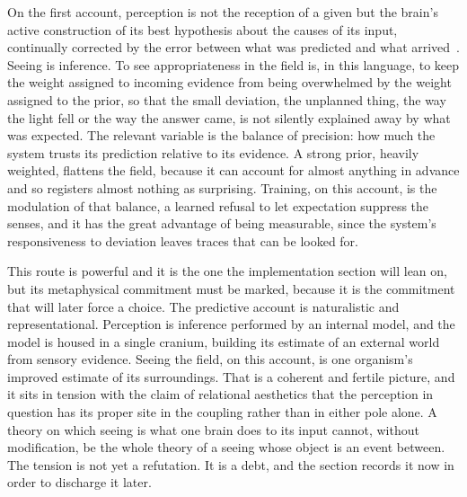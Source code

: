 On the first account, perception is not the reception of a given but the brain's active construction of its best hypothesis about the causes of its input, continually corrected by the error between what was predicted and what arrived~\parencite{clark_whatever,friston_free}. Seeing is inference. To see appropriateness in the field is, in this language, to keep the weight assigned to incoming evidence from being overwhelmed by the weight assigned to the prior, so that the small deviation, the unplanned thing, the way the light fell or the way the answer came, is not silently explained away by what was expected. The relevant variable is the balance of precision: how much the system trusts its prediction relative to its evidence. A strong prior, heavily weighted, flattens the field, because it can account for almost anything in advance and so registers almost nothing as surprising. Training, on this account, is the modulation of that balance, a learned refusal to let expectation suppress the senses, and it has the great advantage of being measurable, since the system's responsiveness to deviation leaves traces that can be looked for.

This route is powerful and it is the one the implementation section will lean on, but its metaphysical commitment must be marked, because it is the commitment that will later force a choice. The predictive account is naturalistic and representational. Perception is inference performed by an internal model, and the model is housed in a single cranium, building its estimate of an external world from sensory evidence. Seeing the field, on this account, is one organism's improved estimate of its surroundings. That is a coherent and fertile picture, and it sits in tension with the claim of relational aesthetics that the perception in question has its proper site in the coupling rather than in either pole alone. A theory on which seeing is what one brain does to its input cannot, without modification, be the whole theory of a seeing whose object is an event between. The tension is not yet a refutation. It is a debt, and the section records it now in order to discharge it later.

